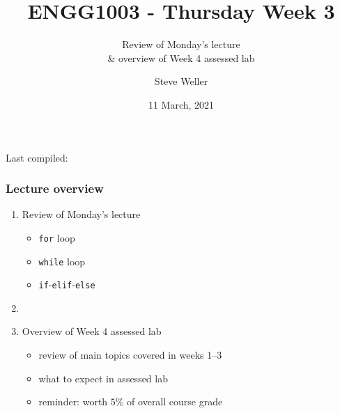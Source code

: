 \documentclass[english,14pt]{beamer}
\title{ENGG1003 - Thursday Week 3}
\subtitle{Review of Monday's lecture \\ \& overview of Week 4 assessed lab}
\author{Steve Weller}
\institute{University of Newcastle}
\date{11 March, 2021}
\begin{document}
\begin{flushleft}
{\scriptsize Last compiled:~\DTMnow}
\vspace*{-5mm}
\end{flushleft}
\framebreak


\begin{frame}[fragile]

\frametitle{Lecture overview}
\begin{enumerate}
	\item Review of Monday's lecture
		\begin{itemize}
			\item \texttt{for} loop
			\item \texttt{while} loop
			\item \texttt{if}-\texttt{elif}-\texttt{else} 
		\end{itemize}

	\item[]
	
	\item Overview of Week 4 assessed lab
	\begin{itemize}
		\item review of main topics covered in weeks 1--3
		\item what to expect in assessed lab
		\item reminder: worth $5$\% of overall course grade
	\end{itemize}	
						
\end{enumerate}

\end{frame}

\end{document}

